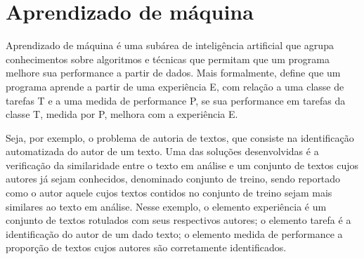\chapter{Aprendizado de máquina}

Aprendizado de máquina é uma subárea de inteligência artificial que agrupa conhecimentos sobre algoritmos e técnicas que permitam que um programa melhore sua performance a partir de dados. Mais formalmente, \cite{Tom_mitchell} define que um programa aprende a partir de uma experiência E, com relação a uma classe de tarefas T e a uma medida de performance P, se sua performance em tarefas da classe T, medida por P, melhora com a experiência E.

Seja, por exemplo, o problema de autoria de textos, que consiste na identificação automatizada do autor de um texto. Uma das soluções desenvolvidas é a verificação da similaridade entre o texto em análise e um conjunto de textos cujos autores já sejam conhecidos, denominado conjunto de treino, sendo reportado como o autor aquele cujos textos contidos no conjunto de treino sejam mais similares ao texto em análise. Nesse exemplo, o elemento experiência é um conjunto de textos rotulados com seus respectivos autores; o elemento tarefa é a identificação do autor de um dado texto; o elemento medida de performance a proporção de textos cujos autores são corretamente identificados.




\cite{ML_debt} \cite{ML_know}

